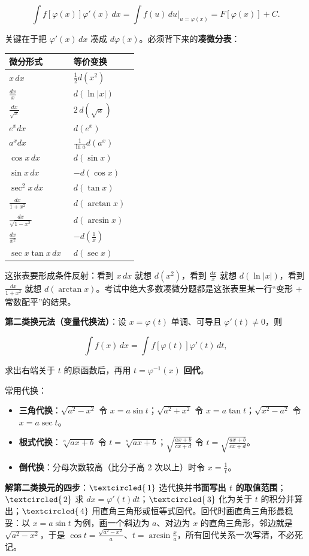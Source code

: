 \documentclass[11pt,openany,UTF8]{ctexbook}
\newcommand{\circled}[1]{\textcircled{\scriptsize\,#1}}
\begin{document}
\[\int f\!\left[\varphi(x)\right]\varphi'(x)\,dx=\int f(u)\,du\Big\vert_{u=\varphi(x)}=F\!\left[\varphi(x)\right]+C.\]

关键在于把 $\varphi'(x)\,dx$ 凑成 $d\varphi(x)$。必须背下来的\textbf{凑微分表}：

\begingroup\small\setlength{\tabcolsep}{4.0pt}
\begin{longtable}{@{}L{0.4728\linewidth}L{0.4728\linewidth}@{}}
\toprule
\textbf{微分形式} & \textbf{等价变换} \\
\midrule
\endhead
$x\,dx$ & $\frac{1}{2}d(x^2)$ \\
$\frac{dx}{x}$ & $d(\ln\lvert x\rvert)$ \\
$\frac{dx}{\sqrt{x}}$ & $2\,d(\sqrt{x})$ \\
$e^{x}dx$ & $d(e^{x})$ \\
$a^{x}dx$ & $\frac{1}{\ln a}d(a^{x})$ \\
$\cos x\,dx$ & $d(\sin x)$ \\
$\sin x\,dx$ & $-d(\cos x)$ \\
$\sec^2x\,dx$ & $d(\tan x)$ \\
$\frac{dx}{1+x^2}$ & $d(\arctan x)$ \\
$\frac{dx}{\sqrt{1-x^2}}$ & $d(\arcsin x)$ \\
$\frac{dx}{x^2}$ & $-d\left(\frac{1}{x}\right)$ \\
$\sec x\tan x\,dx$ & $d(\sec x)$ \\
\bottomrule
\end{longtable}
\endgroup

这张表要形成条件反射：看到 $x\,dx$ 就想 $d(x^2)$，看到 $\frac{dx}{x}$ 就想 $d(\ln\lvert x\rvert)$，看到 $\frac{dx}{1+x^2}$ 就想 $d(\arctan x)$。考试中绝大多数凑微分题都是这张表里某一行“变形 $+$ 常数配平”的结果。

\textbf{第二类换元法（变量代换法）}：设 $x=\varphi(t)$ 单调、可导且 $\varphi'(t)\neq 0$，则

\[\int f(x)\,dx=\int f\!\left[\varphi(t)\right]\varphi'(t)\,dt,\]

求出右端关于 $t$ 的原函数后，再用 $t=\varphi^{-1}(x)$ \textbf{回代}。

常用代换：

\begin{itemize}
\item \textbf{三角代换}：$\sqrt{a^2-x^2}$ 令 $x=a\sin t$；$\sqrt{a^2+x^2}$ 令 $x=a\tan t$；$\sqrt{x^2-a^2}$ 令 $x=a\sec t$。
\item \textbf{根式代换}：$\sqrt[n]{ax+b}$ 令 $t=\sqrt[n]{ax+b}$；$\sqrt{\frac{ax+b}{cx+d}}$ 令 $t=\sqrt{\frac{ax+b}{cx+d}}$。
\item \textbf{倒代换}：分母次数较高（比分子高 2 次以上）时令 $x=\frac{1}{t}$。
\end{itemize}
\textbf{解第二类换元的四步}：$\circled{1}$ 选代换并\textbf{书面写出 $t$ 的取值范围}；$\circled{2}$ 求 $dx=\varphi'(t)dt$；$\circled{3}$ 化为关于 $t$ 的积分并算出；$\circled{4}$ 用直角三角形或恒等式回代。回代时画直角三角形最稳妥：以 $x=a\sin t$ 为例，画一个斜边为 $a$、对边为 $x$ 的直角三角形，邻边就是 $\sqrt{a^2-x^2}$，于是 $\cos t=\frac{\sqrt{a^2-x^2}}{a}$、$t=\arcsin\frac{x}{a}$，所有回代关系一次写清，不必死记。
\end{document}
